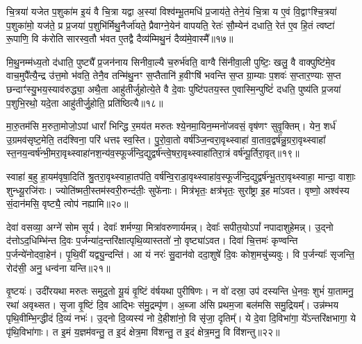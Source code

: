 {\anuvakamend[{अ॒मृत॑म॒ष्टात्रिꣳ॑शच्च॥५॥}]}

चि॒त्रया॑ यजेत प॒शुका॑म इ॒यं वै चि॒त्रा यद्वा अ॒स्यां विश्व॑म्भू॒तमधि॑ प्र॒जाय॑ते॒ तेने॒यं चि॒त्रा य ए॒वं वि॒द्वाꣳश्चि॒त्रया॑ प॒शुका॑मो॒ यज॑ते॒ प्र प्र॒जया॑ प॒शुभि॑र्मिथु॒नैर्जा॑यते॒ प्रैवाग्ने॒येन॑ वापयति॒ रेतः॑ सौ॒म्येन॑ दधाति॒ रेत॑ ए॒व हि॒तं त्वष्टा॑ रू॒पाणि॒ वि क॑रोति सारस्व॒तौ भ॑वत ए॒तद्वै दैव्य॑म्मिथु॒नं दैव्य॑मे॒वास्मै᳚॥१७॥

मि॒थु॒नम्म॑ध्य॒तो द॑धाति॒ पुष्ट्यै᳚ प्र॒जन॑नाय सिनीवा॒ल्यै च॒रुर्भ॑वति॒ वाग्वै सि॑नीवा॒ली पुष्टिः॒ खलु॒ वै वाक्पुष्टि॑मे॒व वाच॒मुपै᳚त्यै॒न्द्र उ॑त्त॒मो भ॑वति॒ तेनै॒व तन्मि॑थु॒नꣳ स॒प्तैतानि॑ ह॒वीꣳषि॑ भवन्ति स॒प्त ग्रा॒म्याः प॒शवः॑ स॒प्तार॒ण्याः स॒प्त छन्दाꣳ॑स्यु॒भय॒स्याव॑रुद्ध्या॒ अथै॒ता आहु॑तीर्जुहोत्ये॒ते वै दे॒वाः पुष्टि॑पतय॒स्त ए॒वास्मि॒न्पुष्टिं॑ दधति॒ पुष्य॑ति प्र॒जया॑ प॒शुभि॒रथो॒ यदे॒ता आहु॑तीर्जु॒होति॒ प्रति॑ष्ठित्यै॥१८॥

{\anuvakamend[{अ॒स्मै॒ त ए॒व द्वाद॑श च॥६॥}]}

मा॒रु॒तम॑सि म॒रुता॒मोजो॒\-ऽपां धारां᳚ भिन्द्धि र॒मय॑त मरुतः श्ये॒नमा॒यिन॒म्मनो॑जवसं॒ वृष॑णꣳ सुवृ॒क्तिम्। येन॒ शर्ध॑ उ॒ग्रमव॑सृष्ट॒मेति॒ तद॑श्विना॒ परि॑ धत्तꣴ स्व॒स्ति। पु॒रो॒वा॒तो वर्\mbox{}ष॑ञ्जि॒न्वरा॒वृथ्स्वाहा॑ वा॒ताव॒द्वर्\mbox{}ष॑न्नु॒ग्ररा॒वृथ्स्वाहा᳚ स्त॒नय॒न्वर्\mbox{}ष॑न्भी॒मरा॒वृथ्स्वाहा॑नश॒न्य॑व॒स्फूर्ज॑न्दि॒द्युद्वर्\mbox{}ष॑न्त्वे॒षरा॒वृथ्स्वाहा॑तिरा॒त्रं वर्\mbox{}ष॑न्पू॒र्तिरा॒वृत्॥१९॥

स्वाहा॑ ब॒हु हा॒यम॑वृषा॒दिति॑ श्रु॒तरा॒वृथ्स्वाहा॒तप॑ति॒ वर्\mbox{}ष॑न्वि॒राडा॒वृथ्स्वाहा॑व॒स्फूर्ज॑न्दि॒द्युद्वर्\mbox{}ष॑न्भू॒तरा॒वृथ्स्वाहा॒ मान्दा॒ वाशाः॒ शुन्ध्यू॒रजि॑राः। ज्योति॑ष्मती॒स्तम॑स्वरी॒रुन्द॑तीः॒ सुफे॑नाः। मित्र॑भृतः॒ क्षत्र॑भृतः॒ सुरा᳚ष्ट्रा इ॒ह मा॑\-ऽवत। वृष्णो॒ अश्व॑स्य सं॒दान॑मसि॒ वृष्ट्यै॒ त्वोप॑ नह्यामि॥२०॥

{\anuvakamend[{पू॒र्तिरा॒वृद्द्विच॑त्वारिꣳशच्च॥७॥}]}

देवा॑ वसव्या॒ अग्ने॑ सोम सूर्य। देवाः᳚ शर्मण्या॒ मित्रा॑वरुणार्यमन्न्। देवाः᳚ सपीत॒यो\-ऽपां᳚ नपादाशुहेमन्न्। उ॒द्नो द॑त्तो\-ऽद॒धिम्भि॑न्त दि॒वः प॒र्जन्या॑द॒न्तरि॑क्षात्पृथि॒व्यास्ततो॑ नो॒ वृष्ट्या॑\-ऽवत। दिवा॑ चि॒त्तमः॑ कृण्वन्ति प॒र्जन्ये॑नोदवा॒हेन॑। पृ॒थि॒वीं यद्व्यु॒न्दन्ति॑। आ यं नरः॑ सु॒दान॑वो ददा॒शुषे॑ दि॒वः कोश॒मचु॑च्यवुः। वि प॒र्जन्याः᳚ सृजन्ति॒ रोद॑सी॒ अनु॒ धन्व॑ना यन्ति॥२१॥

वृ॒ष्टयः॑। उदी॑रयथा मरुतः समुद्र॒तो यू॒यं वृ॒ष्टिं व॑र्\mbox{}षयथा पुरीषिणः। न वो॑ दस्रा॒ उप॑ दस्यन्ति धे॒नवः॒ शुभं॑ या॒तामनु॒ रथा॑ अवृथ्सत। सृ॒जा वृ॒ष्टिं दि॒व आद्भिः स॑मु॒द्रम्पृ॑ण। अ॒ब्जा अ॑सि प्रथम॒जा बल॑मसि समु॒द्रियम्᳚। उन्न॑म्भय पृथि॒वीम्भि॒न्द्धीदं दि॒व्यं नभः॑। उ॒द्नो दि॒व्यस्य॑ नो दे॒हीशा॑नो॒ वि सृ॑जा॒ दृतिम्᳚। ये दे॒वा दि॒विभा॑गा॒ ये᳚\-ऽन्तरि॑क्षभागा॒ ये पृ॑थि॒विभा॑गाः। त इ॒मं य॒ज्ञम॑वन्तु॒ त इ॒दं क्षेत्र॒मा वि॑शन्तु॒ त इ॒दं क्षेत्र॒मनु॒ वि वि॑शन्तु॥२२॥

